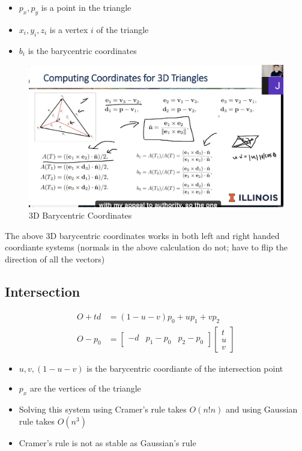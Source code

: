     \begin{itemize}
      \item $ p_{x}, p_{y} $ is a point in the triangle
      \item $ x_{i}, y_{i}, z_{i} $ is a vertex $ i $ of the triangle
      \item $ b_{i} $ is the barycentric coordinates
    \end{itemize}

    \begin{figure}[H]
      \centering
      \caption{3D Barycentric Coordinates}
      \includegraphics[width=0.7\columnwidth]{images/intersection/3d-barycentric.png}
    \end{figure}

    The above 3D barycentric coordinates works in both left and right handed
    coordiante systems (normals in the above calculation do not; have to
    flip the direction of all the vectors)

  \subsection{Intersection}

    \begin{align}
      O + t d &= \left( 1 - u - v \right) p_{0} + u p_{1} + v p_{2} \\
      O - p_{0} &=
      \begin{bmatrix}
        -d & p_{1} - p_{0} & p_{2} - p_{0}
      \end{bmatrix}
      \begin{bmatrix}
        t \\
        u \\
        v
      \end{bmatrix}
    \end{align}

    \begin{itemize}
      \item $ u, v, \left( 1 - u - v \right) $ is the barycentric coordiante
      of the intersection point
      \item $ p_{x} $ are the vertices of the triangle
      \item Solving this system using Cramer's rule takes
      $ O\left( n! n \right) $ and using Gaussian rule takes
      $ O\left( n^{3} \right) $
      \item Cramer's rule is not as stable as Gaussian's rule
    \end{itemize}

